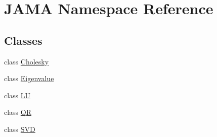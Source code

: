 \hypertarget{namespaceJAMA}{\section{J\-A\-M\-A Namespace Reference}
\label{namespaceJAMA}
}
\subsection*{Classes}
\begin{DoxyCompactItemize}
\item 
class \hyperlink{classJAMA_1_1Cholesky}{Cholesky}
\item 
class \hyperlink{classJAMA_1_1Eigenvalue}{Eigenvalue}
\item 
class \hyperlink{classJAMA_1_1LU}{L\-U}
\item 
class \hyperlink{classJAMA_1_1QR}{Q\-R}
\item 
class \hyperlink{classJAMA_1_1SVD}{S\-V\-D}
\end{DoxyCompactItemize}
